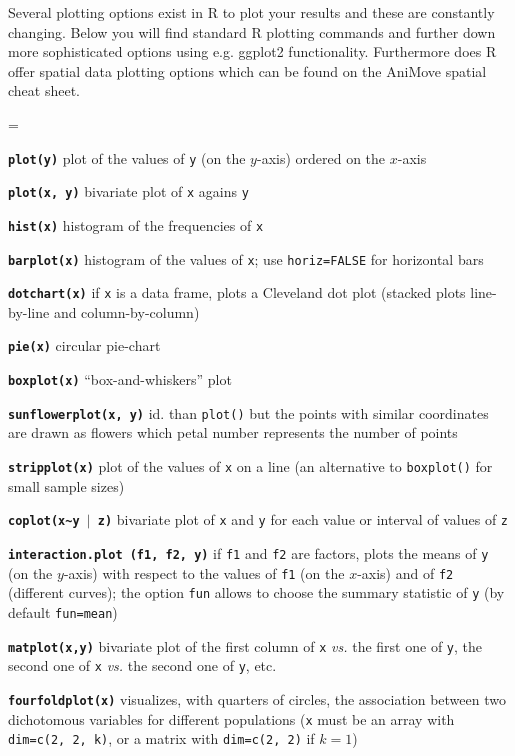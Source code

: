 \documentclass[8pt,landscape]{article}
\newcommand{\code}{\texttt}
\newcommand{\bcode}[1]{\texttt{\textbf{#1}}}
\begin{document}
\begin{multicols*}{3}
Several plotting options exist in R to plot your results and these are constantly changing. Below you will find standard R plotting commands and further down more sophisticated options using e.g. ggplot2 functionality. Furthermore does R offer spatial data plotting options which can be found on the AniMove spatial cheat sheet.

\bigskip

\everypar={\hangindent=9mm}

\bcode{plot(y)}  plot of the values of \code{y} (on the $y$-axis) ordered on the $x$-axis

\bcode{plot(x, y)}  bivariate plot of \code{x} agains \code{y}

\bcode{hist(x)}  histogram of the frequencies of \code{x}

\bcode{barplot(x)}  histogram of the values of \code{x}; use
\code{horiz=FALSE} for horizontal bars

\bcode{dotchart(x)}  if \code{x} is a data frame, plots a Cleveland dot plot (stacked plots line-by-line and column-by-column)

\bcode{pie(x)}  circular pie-chart

\bcode{boxplot(x)}  ``box-and-whiskers'' plot

\bcode{sunflowerplot(x, y)}  id. than \code{plot()} but the points with similar coordinates are drawn as flowers which petal number represents the number of points

\bcode{stripplot(x)}  plot of the values of \code{x} on a line (an alternative to \code{boxplot()} for small sample sizes)

\bcode{coplot(x\~{}y $\mid$ z)}  bivariate plot of \code{x} and \code{y} for each value or interval of values of \code{z}

\bcode{interaction.plot (f1, f2, y)}  if \code{f1} and \code{f2} are factors, plots the means of \code{y} (on the $y$-axis) with respect to the values of \code{f1} (on the $x$-axis) and of \code{f2} (different curves); the option \code{fun} allows to choose the summary statistic of \code{y} (by default \code{fun=mean})

\bcode{matplot(x,y)}  bivariate plot of the first column of \code{x} {\it vs.} the first one of \code{y}, the second one of \code{x} {\it vs.} the second one of \code{y}, etc.

\bcode{fourfoldplot(x)}  visualizes, with quarters of circles, the association between two dichotomous variables for different populations (\code{x} must be an array with \code{dim=c(2, 2, k)}, or a matrix with \code{dim=c(2, 2)} if $k=1$)


\end{multicols*}
\end{document}
